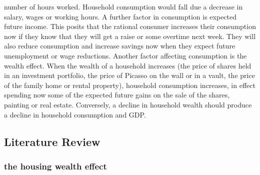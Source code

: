 \documentclass[12pt,a4paper,]{article}
\begin{document}
number of hours worked. Household consumption would fall due a decrease
in salary, wages or working hours. A further factor in consumption is
expected future income. This posits that the rational consumer increases
their consumption now if they know that they will get a raise or some
overtime next week. They will also reduce consumption and increase
savings now when they expect future unemployment or wage reductions.
Another factor affecting consumption is the wealth effect. When the
wealth of a household increases (the price of shares held in an
investment portfolio, the price of Picasso on the wall or in a vault,
the price of the family home or rental property), household consumption
increases, in effect spending now some of the expected future gains on
the sale of the shares, painting or real estate. Conversely, a decline
in household wealth should produce a decline in household consumption
and GDP.

\subsection{Literature Review}\label{literature-review}

\subsubsection{the housing wealth
effect}\label{the-housing-wealth-effect}
\end{document}
